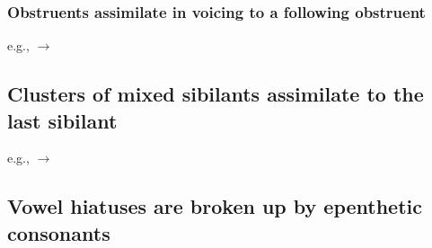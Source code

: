 \subsubsection{Obstruents assimilate in voicing to a following obstruent}

e.g.,   $\to$ 

\subsection{Clusters of mixed sibilants assimilate to the last sibilant}

e.g.,   $\to$ 

\subsection{Vowel hiatuses are broken up by epenthetic consonants}


